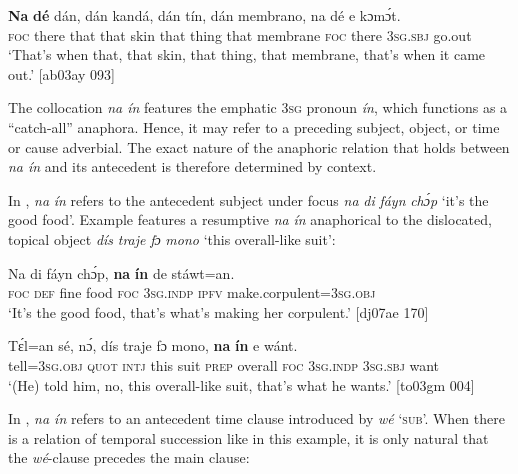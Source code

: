 \ea%
    \label{ex:key:720}
    \gll \textbf{Na}  \textbf{dé}   dán,    dán  kandá,  dán  tín,    dán  membrano,
na  dé    e    kɔmɔ́t.\\
\textsc{foc}  there  that    that  skin    that  thing  that  membrane
\textsc{foc}  there  \textsc{3sg.sbj}  go.out\\

\glt ‘That’s when that, that skin, that thing, that membrane, that’s when 
it came out.’ [ab03ay 093]
\z

The collocation \textit{na ín} features the emphatic \textsc{3sg} pronoun \textit{ín}, which functions as a “catch-all” anaphora. Hence, it may refer to a preceding subject, object, or time or cause adverbial. The exact nature of the anaphoric relation that holds between \textit{na ín} and its antecedent is therefore determined by context.


In , \textit{na} \textit{ín} refers to the antecedent subject under focus \textit{na} \textit{di} \textit{fáyn} \textit{chɔ́p} ‘it’s the good food’. Example  features a resumptive \textit{na} \textit{ín} anaphorical to the dislocated, topical object \textit{dís} \textit{traje} \textit{fɔ} \textit{mono} ‘this overall-like suit’:



\ea%
    \label{ex:key:721}
    \gll Na  di  fáyn    chɔ́p,  \textbf{na}  \textbf{ín}   de  stáwt=an.\\
\textsc{foc}  \textsc{def}  fine    food    \textsc{foc}  \textsc{3sg.indp}  \textsc{ipfv}  make.corpulent=\textsc{3sg.obj}\\

\glt ‘It’s the good food, that’s what’s making her corpulent.’ [dj07ae 170]
\z


\ea%
    \label{ex:key:722}
    \gll Tɛ́l=an    sé,    nɔ́,  dís  traje  fɔ  mono,
\textbf{na}  \textbf{ín}    e    wánt.\\
tell=\textsc{3sg.obj}  \textsc{quot}    \textsc{intj}  this  suit    \textsc{prep}  overall
\textsc{foc}  \textsc{3sg.indp}  \textsc{3sg.sbj}  want\\

\glt ‘(He) told him, no, this overall-like suit, that’s what 
he wants.’ [to03gm 004]
\z

In , \textit{na ín} refers to an antecedent time clause introduced by \textit{wé} ‘\textsc{sub}’. When there is a relation of temporal succession like in this example, it is only natural that the \textit{wé}{}-clause precedes the main clause:


